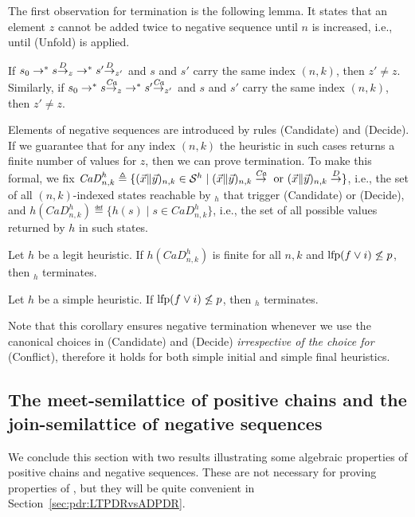 The first observation for termination is the following lemma. It states that an element $z$ cannot be added twice to negative sequence until $n$ is increased, i.e., until (Unfold) is applied.
\begin{lemma}\label{lmm:pdr:differentz}
	If $s_0 \stackrel{}{\to^*} s {\stackrel{D}{\to}}_{z} \stackrel{ }{\to^*} s' {\stackrel{D}{\to}}_{z'} $ and $s$ and $s'$ carry the same index $(n,k)$, then $z' \neq z$.
	Similarly, if $s_0 \stackrel{}{\to^*} s {\stackrel{\mathit{Ca}}{\to}}_{z} \stackrel{ }{\to^*} s' {\stackrel{\mathit{Ca}}{\to}}_{z'} $ and $s$ and $s'$ carry the same index $(n,k)$, then $z' \neq z$.
\end{lemma}

Elements of negative sequences are introduced by rules (Candidate) and (Decide). If we guarantee that for any index $(n,k)$ the heuristic in such cases returns a finite number of values for $z$, then we can prove termination. To make this formal, we fix $\mathit{CaD}^h_{n,k} \triangleq \{ ( \vec{x} \| \vec{y} )_{n,k}\in \mathcal{S}^h \mid ( \vec{x} \| \vec{y} )_{n,k}\stackrel{\mathit{Ca}}{\to} \text{ or } ( \vec{x} \| \vec{y} )_{n,k}\stackrel{D}{\to}\}$, i.e., the set of all $(n,k)$-indexed states reachable by {\APDR}$_h$ that trigger (Candidate) or (Decide), and $h(\mathit{CaD}^h_{n,k}) \eqdef \{h(s) \mid s\in \mathit{CaD}^h_{n,k}\}$, i.e., the set of all possible values returned by $h$ in such states.

\begin{theorem}\label{th:pdr:negativetermination}
	Let $h$ be a legit heuristic. If $h(\mathit{CaD}^h_{n,k})$ is finite for all $n,k$ and $\text{lfp}(f\lor i) \not \le p$, then \emph{\APDR}$_h$ terminates.
\end{theorem}

\begin{corollary}\label{cor:pdr:negativetermiantion}
	Let $h$ be a simple heuristic.
	If $\text{lfp}(f\lor i) \not \le p$, then \emph{\APDR}$_h$ terminates.
\end{corollary}

Note that this corollary ensures negative termination whenever we use the canonical choices in (Candidate) and (Decide) \emph{irrespective of the choice for} (Conflict), therefore it holds for both simple initial and simple final heuristics.

\subsection{The meet-semilattice of positive chains and the join-semilattice of negative sequences}
We conclude this section with two results illustrating some algebraic properties of positive chains and negative sequences. These are not necessary for proving properties of {\APDR}, but they will be quite convenient in Section~\ref{sec:pdr:LTPDRvsADPDR}.

